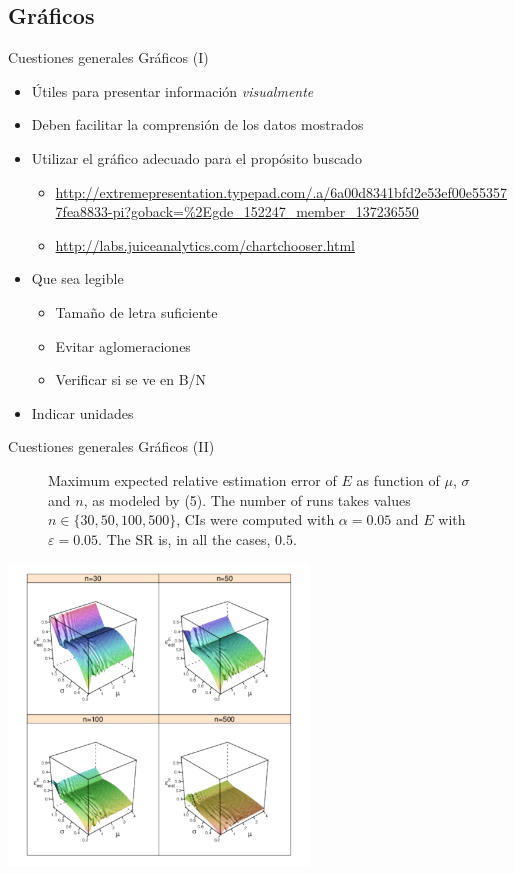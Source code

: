 \documentclass{beamer}
\begin{document}
\subsection{Gráficos}
\begin{frame}{Cuestiones generales} {Gráficos (I)}
	\begin{itemize}
		\item Útiles para presentar información \textit{visualmente}
		\item Deben facilitar la comprensión de los datos mostrados
		\item Utilizar el gráfico adecuado para el propósito buscado
			\begin{itemize}
			\item \url{http://extremepresentation.typepad.com/.a/6a00d8341bfd2e53ef00e553577fea8833-pi?goback=\%2Egde\_152247\_member\_137236550}
			\item \url{http://labs.juiceanalytics.com/chartchooser.html}
			\end{itemize}
		\item Que sea legible
			\begin{itemize}
			\item Tamaño de letra suficiente
			\item Evitar aglomeraciones
			\item Verificar si se ve en B/N
			\end{itemize}
		\item Indicar unidades
	\end{itemize}
\end{frame}

\begin{frame}[plain]{Cuestiones generales} {Gráficos (II)}
\begin{figure}[t]
 \caption{Maximum expected relative estimation error of $E$ as function of $\mu$, $\sigma$ and $n$, as modeled by (5). The number of runs takes values $n\in\{30,50,100,500\}$, CIs were computed with $\alpha=0.05$ and $E$ with $\varepsilon=0.05$. The SR is, in all the cases, $0.5$.}\label{fig:E-error}\end{figure}
 \vspace{-1.2cm}
\begin{center}
\includegraphics[width=0.6\textwidth]{figs/E-error.pdf}
 \end{center}
\end{frame}
\end{document}
